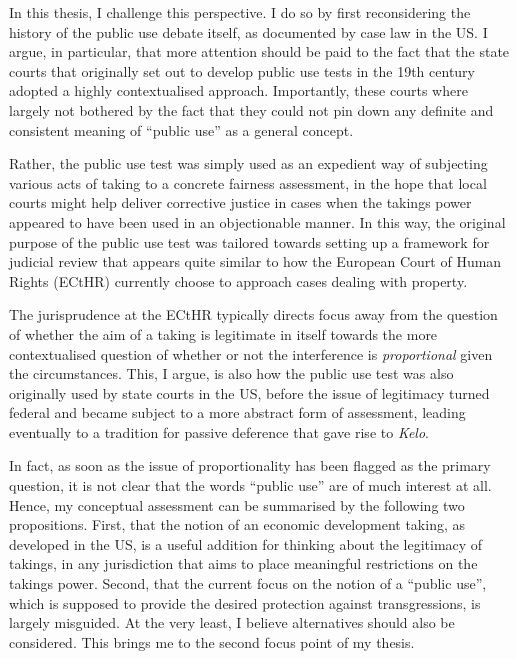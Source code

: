 \documentclass{article} %
\begin{document}
In this thesis, I challenge this perspective. I do so by first reconsidering the history of the public use debate itself, as documented by case law in the US. I argue, in particular, that more attention should be paid to the fact that the state courts that originally set out to develop public use tests in the 19th century adopted a highly contextualised approach. Importantly, these courts where largely not bothered by the fact that they could not pin down any definite and consistent meaning of ``public use'' as a general concept. 

Rather, the public use test was simply used as an expedient way of subjecting various acts of taking to a concrete fairness assessment, in the hope that local courts might help deliver corrective justice in cases when the takings power appeared to have been used in an objectionable manner. In this way, the original purpose of the public use test was tailored towards setting up a framework for judicial review that appears quite similar to how the European Court of Human Rights (ECtHR) currently choose to approach cases dealing with property.

The jurisprudence at the ECtHR typically directs focus away from the question of whether the aim of a taking is legitimate in itself towards the more contextualised question of whether or not the interference is {\it proportional} given the circumstances. This, I argue, is also how the public use test was also originally used by state courts in the US, before the issue of legitimacy turned federal and became subject to a more abstract form of assessment, leading eventually to a tradition for passive deference that gave rise to {\it Kelo}.

In fact, as soon as the issue of proportionality has been flagged as the primary question, it is not clear that the words ``public use'' are of much interest at all. Hence, my conceptual assessment can be summarised by the following two propositions. First, that the notion of an economic development taking, as developed in the US, is a useful addition for thinking about the legitimacy of takings, in any jurisdiction that aims to place meaningful restrictions on the takings power. Second, that the current focus on the notion of a ``public use'', which is supposed to provide the desired protection against transgressions, is largely misguided. At the very least, I believe alternatives should also be considered. This brings me to the second focus point of my thesis.
\end{document}
